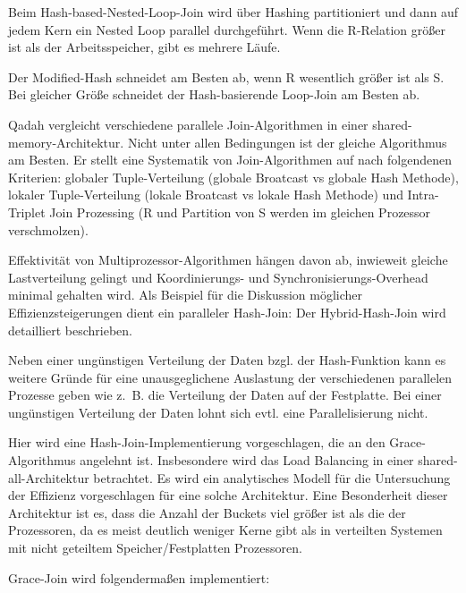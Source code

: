 \documentclass[a4paper,12pt,twoside]{article}
\begin{document}
Beim Hash-based-Nested-Loop-Join wird über Hashing partitioniert und dann auf jedem Kern ein Nested Loop parallel durchgeführt. Wenn die R-Relation größer ist als der Arbeitsspeicher, gibt es mehrere Läufe.

Der Modified-Hash schneidet am Besten ab, wenn R wesentlich größer ist als S. Bei gleicher Größe schneidet der Hash-basierende Loop-Join am Besten ab.

\textbf{}

Qadah vergleicht verschiedene parallele Join-Algorithmen in einer shared-memory-Architektur. Nicht unter allen Bedingungen ist der gleiche Algorithmus am Besten. Er stellt eine Systematik von Join-Algorithmen auf nach folgendenen Kriterien: globaler Tuple-Verteilung (globale Broatcast vs globale Hash Methode), lokaler Tuple-Verteilung (lokale Broatcast vs lokale Hash Methode) und Intra-Triplet Join Prozessing (R und Partition von S werden im gleichen Prozessor verschmolzen). 

\textbf{}

Effektivität von Multiprozessor-Algorithmen hängen davon ab, inwieweit gleiche Lastverteilung gelingt und Koordinierungs- und Synchronisierungs-Overhead minimal gehalten wird. Als Beispiel für die Diskussion möglicher Effizienzsteigerungen dient ein paralleler Hash-Join: Der Hybrid-Hash-Join wird detailliert beschrieben.

Neben einer ungünstigen Verteilung der Daten bzgl. der Hash-Funktion kann es weitere Gründe für eine unausgeglichene Auslastung der verschiedenen parallelen Prozesse geben wie z.~B. die Verteilung der Daten auf der Festplatte. Bei einer ungünstigen Verteilung der Daten lohnt sich evtl. eine Parallelisierung nicht.  

\textbf{}

Hier wird eine Hash-Join-Implementierung vorgeschlagen, die an den Grace-Algorithmus angelehnt ist. Insbesondere wird das Load Balancing in einer shared-all-Architektur betrachtet. Es wird ein analytisches Modell für die Untersuchung der Effizienz vorgeschlagen für eine solche Architektur. Eine Besonderheit dieser Architektur ist es, dass die Anzahl der Buckets viel größer ist als die der Prozessoren, da es meist deutlich weniger Kerne gibt als in verteilten Systemen mit nicht geteiltem Speicher/Festplatten Prozessoren. 

Grace-Join wird folgendermaßen implementiert:
\end{document}
